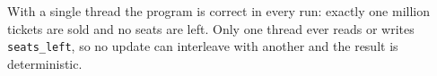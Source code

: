 
With a single thread the program is correct in every run: exactly one million
tickets are sold and no seats are left. Only one thread ever reads or writes
\texttt{seats\_left}, so no update can interleave with another and the result is
deterministic.
